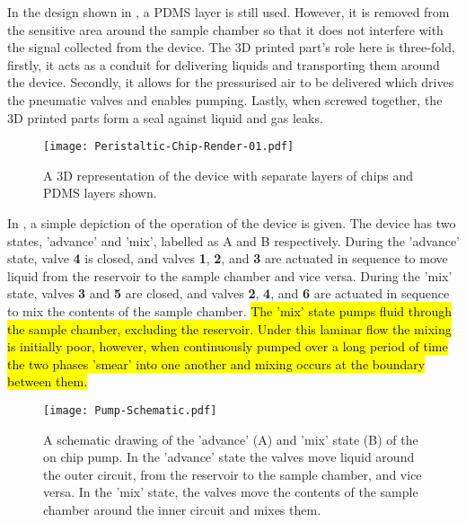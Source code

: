 In the design shown in , a PDMS layer is still used. However, it is removed from the
sensitive area around the sample chamber so that it does not interfere with the signal
collected from the device. The 3D printed part's role here is three-fold, firstly, it acts
as a conduit for delivering liquids and transporting them around the device. Secondly, it
allows for the pressurised air to be delivered which drives the pneumatic valves and
enables pumping. Lastly, when screwed together, the 3D printed parts form a seal against
liquid and gas leaks.

\begin{figure}[ht]
  \begin{center}
  \texttt{[image: Peristaltic-Chip-Render-01.pdf]}
  \caption{A 3D representation of the device with separate layers of chips and PDMS
  layers shown.}
  \label{fig:3Ddevice}
  \end{center}
\end{figure}

In , a simple depiction of the operation of the device is given. The
device has two states, 'advance' and 'mix', labelled as A and B respectively. During the 'advance'
state, valve \textbf{4} is closed, and valves \textbf{1}, \textbf{2}, and \textbf{3} are actuated in sequence to move liquid from
the reservoir to the sample chamber and vice versa. During the 'mix' state, valves \textbf{3}
and \textbf{5} are closed, and valves \textbf{2}, \textbf{4}, and \textbf{6} are actuated in sequence
to mix the contents of the sample chamber. \hl{The 'mix' state pumps fluid through the sample chamber, excluding the
reservoir. Under this laminar flow the mixing is initially poor, however, when continuously pumped over a long period
of time the two phases 'smear' into one another and mixing occurs at the boundary between them.}

\begin{figure}[ht]
  \begin{center}
  \texttt{[image: Pump-Schematic.pdf]}
  \caption{A schematic drawing of the 'advance' (A) and 'mix' state (B) of the on chip pump. In the 'advance'
  state the valves move liquid around the outer circuit, from the reservoir to the sample chamber, and vice versa.
  In the 'mix' state, the valves move the contents of the sample chamber around the inner circuit and mixes them.}
  \label{fig:OperationSchematic}
  \end{center}
\end{figure}


